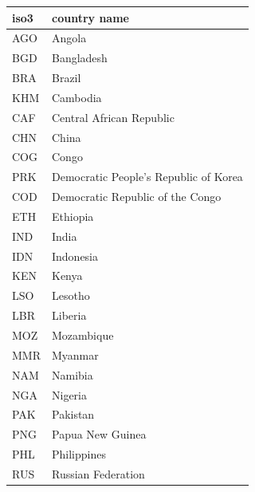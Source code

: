 \documentclass[12pt]{article}
\begin{document}
\begin{table}[]
  \centering
\begin{tabular}{|l|l|}
\hline
\textbf{iso3} & \textbf{country name}                 \\ \hline
AGO           & Angola                                \\ \hline
BGD           & Bangladesh                            \\ \hline
BRA           & Brazil                                \\ \hline
KHM           & Cambodia                              \\ \hline
CAF           & Central African Republic              \\ \hline
CHN           & China                                 \\ \hline
COG           & Congo                                 \\ \hline
PRK           & Democratic People's Republic of Korea \\ \hline
COD           & Democratic Republic of the Congo      \\ \hline
ETH           & Ethiopia                              \\ \hline
IND           & India                                 \\ \hline
IDN           & Indonesia                             \\ \hline
KEN           & Kenya                                 \\ \hline
LSO           & Lesotho                               \\ \hline
LBR           & Liberia                               \\ \hline
MOZ           & Mozambique                            \\ \hline
MMR           & Myanmar                               \\ \hline
NAM           & Namibia                               \\ \hline
NGA           & Nigeria                               \\ \hline
PAK           & Pakistan                              \\ \hline
PNG           & Papua New Guinea                      \\ \hline
PHL           & Philippines                           \\ \hline
RUS           & Russian Federation                    \\ \hline

\end{tabular}
\end{table}
\end{document}
